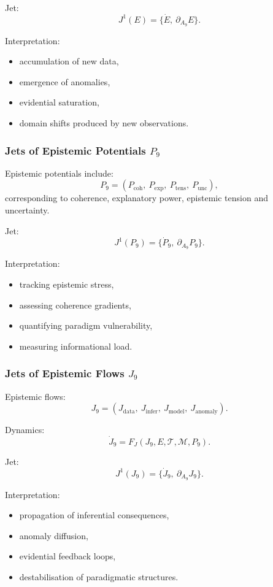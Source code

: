 Jet:
\[
J^1(E)=\{\dot{E},\ \partial_{A_9}E\}.
\]

Interpretation:
\begin{itemize}
    \item accumulation of new data,
    \item emergence of anomalies,
    \item evidential saturation,
    \item domain shifts produced by new observations.
\end{itemize}


\subsubsection{Jets of Epistemic Potentials \texorpdfstring{$P_9$}{P_9}}

Epistemic potentials include:
\[
P_9=
(P_{\mathrm{coh}},\
 P_{\mathrm{exp}},\
 P_{\mathrm{tens}},\
 P_{\mathrm{unc}}),
\]
corresponding to coherence, explanatory power, epistemic tension and
uncertainty.

Jet:
\[
J^1(P_9)=\{\dot{P}_9,\ \partial_{A_9}P_9\}.
\]

Interpretation:
\begin{itemize}
    \item tracking epistemic stress,
    \item assessing coherence gradients,
    \item quantifying paradigm vulnerability,
    \item measuring informational load.
\end{itemize}


\subsubsection{Jets of Epistemic Flows \texorpdfstring{$J_9$}{J_9}}

Epistemic flows:
\[
J_9=
(J_{\mathrm{data}},\
 J_{\mathrm{infer}},\
 J_{\mathrm{model}},\
 J_{\mathrm{anomaly}}).
\]

Dynamics:
\[
\dot{J}_9 =
F_J(J_9,E,\mathcal{T},\mathcal{M},P_9).
\]

Jet:
\[
J^1(J_9)=\{\dot{J}_9,\ \partial_{A_9}J_9\}.
\]

Interpretation:
\begin{itemize}
    \item propagation of inferential consequences,
    \item anomaly diffusion,
    \item evidential feedback loops,
    \item destabilisation of paradigmatic structures.
\end{itemize}


